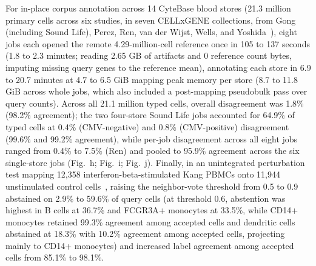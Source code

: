 For in-place corpus annotation across 14 CyteBase blood stores (21.3 million primary cells across six studies, in seven CELLxGENE collections, from Gong (including Sound Life), Perez, Ren, van der Wijst, Wells, and Yoshida~\cite{gong2025multiomic,perez2022singlecell,ren2021covid19,vanderwijst2021type,wells2025multimodal,yoshida2021local}), eight jobs each opened the remote 4.29-million-cell reference once in 105 to 137 seconds (1.8 to 2.3 minutes; reading 2.65 GB of artifacts and 0 reference count bytes, imputing missing query genes to the reference mean), annotating each store in 6.9 to 20.7 minutes at 4.7 to 6.5 GiB mapping peak memory per store (8.7 to 11.8 GiB across whole jobs, which also included a post-mapping pseudobulk pass over query counts). Across all 21.1 million typed cells, overall disagreement was 1.8\% (98.2\% agreement); the two four-store Sound Life jobs accounted for 64.9\% of typed cells at 0.4\% (CMV-negative) and 0.8\% (CMV-positive) disagreement (99.6\% and 99.2\% agreement), while per-job disagreement across all eight jobs ranged from 0.4\% to 7.5\% (Ren) and pooled to 95.9\% agreement across the six single-store jobs (Fig.~h; Fig.~i; Fig.~j). Finally, in an unintegrated perturbation test mapping 12,358 interferon-beta-stimulated Kang PBMCs onto 11,944 unstimulated control cells~\cite{kang2018}, raising the neighbor-vote threshold from 0.5 to 0.9 abstained on 2.9\% to 59.6\% of query cells (at threshold 0.6, abstention was highest in B cells at 36.7\% and FCGR3A+ monocytes at 33.5\%, while CD14+ monocytes retained 99.3\% agreement among accepted cells and dendritic cells abstained at 18.3\% with 10.2\% agreement among accepted cells, projecting mainly to CD14+ monocytes) and increased label agreement among accepted cells from 85.1\% to 98.1\%.

\label{note:Multimodal WNN benchmarks}

